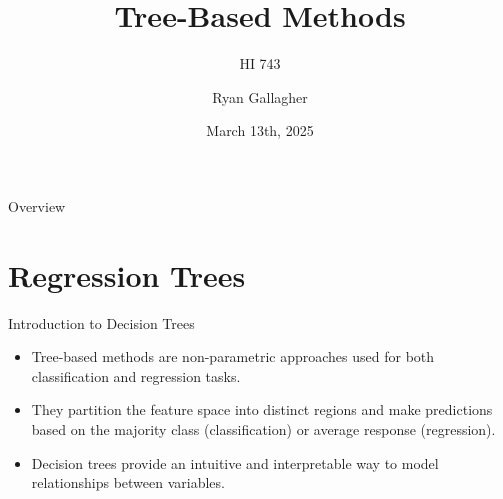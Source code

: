 \documentclass[aspectratio=169,xcolor=dvipsnames]{beamer}
\title{Tree-Based Methods}
\subtitle{HI 743}
\author{Ryan Gallagher}
\institute
{
    Department of Health Informatics and Administration \\
    Zilber College of Public Health \\
    University of Wisconsin - Milwaukee%
}
\date{March 13th, 2025} %
\begin{document}
\begin{frame}
    \titlepage
\end{frame}


\begin{frame}{Overview}
    \tableofcontents
\end{frame}

\section{Regression Trees}
\begin{frame}{Introduction to Decision Trees}
    \begin{itemize}
    	\setlength\itemsep{0.5cm}
        \item Tree-based methods are non-parametric approaches used for both classification and regression tasks.
        \item They partition the feature space into distinct regions and make predictions based on the majority class (classification) or average response (regression).
        \item Decision trees provide an intuitive and interpretable way to model relationships between variables.
    \end{itemize}
\end{frame}
\end{document}
